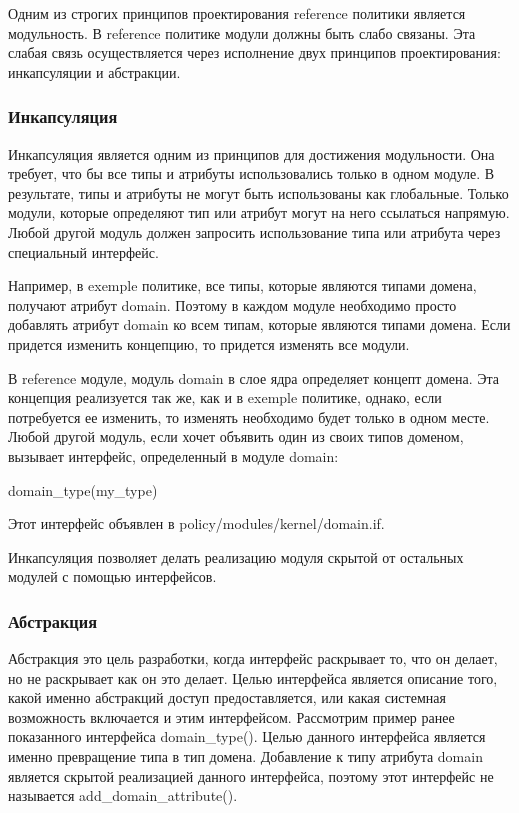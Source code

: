 \documentclass{./../class/UIR}
\begin{document}
	Одним из строгих принципов проектирования reference политики является
	модульность. В reference политике модули должны быть слабо связаны. Эта слабая
	связь осуществляется через исполнение двух принципов проектирования:
	инкапсуляции и абстракции.
	
	\subsubsection{Инкапсуляция}
	
	Инкапсуляция является одним из принципов для достижения модульности. Она
	требует, что бы все типы и атрибуты использовались только в одном модуле. В
	результате, типы и атрибуты не могут быть использованы как глобальные. Только
	модули, которые определяют тип или атрибут могут на него ссылаться напрямую.
	Любой другой модуль должен запросить использование типа или атрибута через
	специальный интерфейс.
	
	Например, в exemple политике, все типы, которые являются типами домена,
	получают атрибут domain. Поэтому в каждом модуле необходимо просто добавлять
	атрибут domain ко всем типам, которые являются типами домена. Если придется
	изменить концепцию, то придется изменять все модули.
	
	В reference модуле, модуль domain в слое ядра определяет концепт домена. Эта
	концепция реализуется так же, как и в exemple политике, однако, если
	потребуется ее изменить, то изменять необходимо будет только в одном месте.
	Любой другой модуль, если хочет объявить один из своих типов доменом, вызывает
	интерфейс, определенный в модуле domain:
	
	domain\_type(my\_type) 
	
	Этот интерфейс объявлен в policy/modules/kernel/domain.if. 
	
	Инкапсуляция позволяет делать реализацию модуля скрытой от остальных модулей с
	помощью интерфейсов.
	\subsubsection{Абстракция}
	
	Абстракция это цель разработки, когда интерфейс раскрывает то, что он делает,
	но не раскрывает как он это делает. Целью интерфейса является описание того,
	какой именно абстракций доступ предоставляется, или какая системная возможность
	включается и этим интерфейсом. Рассмотрим пример ранее показанного интерфейса
	domain\_type(). Целью данного интерфейса является именно превращение типа в тип
	домена. Добавление к типу атрибута domain является скрытой реализацией данного
	интерфейса, поэтому этот интерфейс не называется add\_domain\_attribute(). 
	
\end{document}
